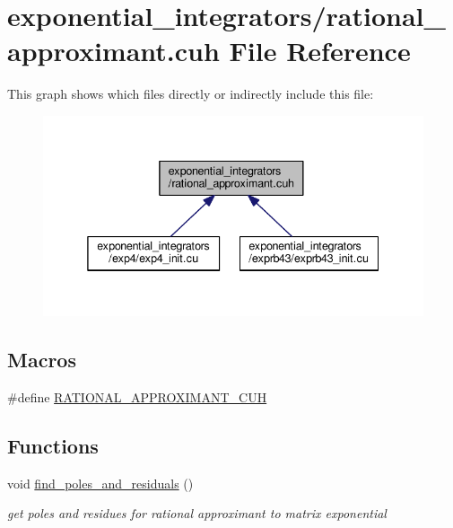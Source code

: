 \hypertarget{rational__approximant_8cuh}{}\section{exponential\+\_\+integrators/rational\+\_\+approximant.cuh File Reference}
\label{rational__approximant_8cuh}
This graph shows which files directly or indirectly include this file\+:\nopagebreak
\begin{figure}[H]
\begin{center}
\leavevmode
\includegraphics[width=338pt]{rational__approximant_8cuh__dep__incl}
\end{center}
\end{figure}
\subsection*{Macros}
\begin{DoxyCompactItemize}
\item 
\#define \hyperlink{rational__approximant_8cuh_a49e3ef1a16cc7452a190cbf970b398ec}{R\+A\+T\+I\+O\+N\+A\+L\+\_\+\+A\+P\+P\+R\+O\+X\+I\+M\+A\+N\+T\+\_\+\+C\+UH}
\end{DoxyCompactItemize}
\subsection*{Functions}
\begin{DoxyCompactItemize}
\item 
void \hyperlink{rational__approximant_8cuh_a1cb9bed79a1ce457c891851da0cec0ba}{find\+\_\+poles\+\_\+and\+\_\+residuals} ()
\begin{DoxyCompactList}\small\item\em get poles and residues for rational approximant to matrix exponential \end{DoxyCompactList}\end{DoxyCompactItemize}


